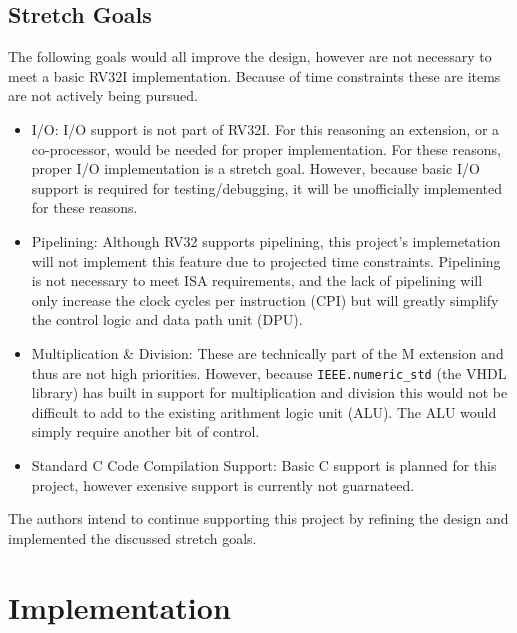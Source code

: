 \documentclass[lettersize,journal]{IEEEtran}
\begin{document}
\begin{itemize}
\subsection{Stretch Goals}
The following goals would all improve the design, however are not necessary to meet a basic RV32I implementation.
Because of time constraints these are items are not actively being pursued.
\begin{itemize}
    \item I/O: I/O support is not part of RV32I. For this reasoning an extension, or a co-processor, would be needed for proper implementation.
        For these reasons, proper I/O implementation is a stretch goal. However, because basic I/O support is required for testing/debugging, it will be unofficially
        implemented for these reasons.
    \item Pipelining: Although RV32 supports pipelining, this project's implemetation will not implement this feature due to projected time constraints.
        Pipelining is not necessary to meet ISA requirements, and the lack of pipelining will only increase the clock cycles per instruction (CPI) but will greatly
        simplify the control logic and data path unit (DPU).
    \item Multiplication \& Division: These are technically part of the M extension \cite{riscvunprovisioned} and thus are not high priorities.
        However, because \verb|IEEE.numeric_std| (the VHDL library) has built in support for multiplication and division this would not be difficult to add to
        the existing arithment logic unit (ALU). The ALU would simply require another bit of control.
    \item Standard C Code Compilation Support: Basic C support is planned for this project, however exensive support is currently not guarnateed.
\end{itemize}
The authors intend to continue supporting this project by refining the design and implemented the discussed stretch goals.
 
\section{Implementation}

\end{itemize}
\end{document}
